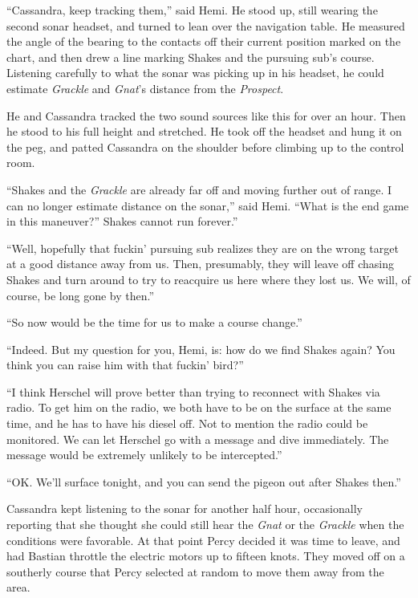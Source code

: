 \documentclass[
]{scrbook}
\begin{document}
``Cassandra, keep tracking them,'' said Hemi. He stood up, still wearing
the second sonar headset, and turned to lean over the navigation table.
He measured the angle of the bearing to the contacts off their current
position marked on the chart, and then drew a line marking Shakes and
the pursuing sub's course. Listening carefully to what the sonar was
picking up in his headset, he could estimate \emph{Grackle} and
\emph{Gnat}'s distance from the \emph{Prospect}.

He and Cassandra tracked the two sound sources like this for over an
hour. Then he stood to his full height and stretched. He took off the
headset and hung it on the peg, and patted Cassandra on the shoulder
before climbing up to the control room.

``Shakes and the \emph{Grackle} are already far off and moving further
out of range. I can no longer estimate distance on the sonar,'' said
Hemi. ``What is the end game in this maneuver?'' Shakes cannot run
forever.''

``Well, hopefully that fuckin' pursuing sub realizes they are on the
wrong target at a good distance away from us. Then, presumably, they
will leave off chasing Shakes and turn around to try to reacquire us
here where they lost us. We will, of course, be long gone by then.''

``So now would be the time for us to make a course change.''

``Indeed. But my question for you, Hemi, is: how do we find Shakes
again? You think you can raise him with that fuckin' bird?''

``I think Herschel will prove better than trying to reconnect with
Shakes via radio. To get him on the radio, we both have to be on the
surface at the same time, and he has to have his diesel off. Not to
mention the radio could be monitored. We can let Herschel go with a
message and dive immediately. The message would be extremely unlikely to
be intercepted.''

``OK. We'll surface tonight, and you can send the pigeon out after
Shakes then.''

Cassandra kept listening to the sonar for another half hour,
occasionally reporting that she thought she could still hear the
\emph{Gnat} or the \emph{Grackle} when the conditions were favorable. At
that point Percy decided it was time to leave, and had Bastian throttle
the electric motors up to fifteen knots. They moved off on a southerly
course that Percy selected at random to move them away from the area.
\end{document}
